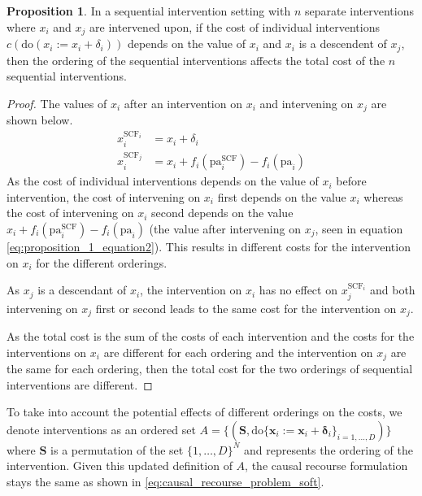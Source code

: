 \textbf{Proposition 1}. In a sequential intervention setting with $n$ separate interventions where $x_i$ and $x_j$ are intervened upon, if the cost of individual interventions $c(\text{do}(x_i:=x_i + \delta_i))$ depends on the value of $x_i$ and $x_i$ is a descendent of $x_j$, then the ordering of the sequential interventions affects the total cost of the $n$ sequential interventions.

\begin{proof}
	The values of $x_i$ after an intervention on $x_i$ and intervening on $x_j$ are shown below.
	\begin{align} \label{eq:proposition_1_equation}
		x^{\text{SCF}_i}_i & = x_i + \delta_i \\ \label{eq:proposition_1_equation2}
		x^{\text{SCF}_j}_i & = x_i + f_i(\text{pa}^{\text{SCF}}_i) - f_i(\text{pa}_i)
	\end{align}
	As the cost of individual interventions depends on the value of $x_i$ before intervention, the cost of intervening on $x_i$ first depends on the value $x_i$ whereas the cost of intervening on $x_i$ second depends on the value $x_i + f_i(\text{pa}^{\text{SCF}}_i) - f_i(\text{pa}_i)$ (the value after intervening on $x_j$, seen in equation \ref{eq:proposition_1_equation2}). This results in different costs for the intervention on $x_i$ for the different orderings.
	
	As $x_j$ is a descendant of $x_i$, the intervention on $x_i$ has no effect on $x^{\text{SCF}_i}_j$ and both intervening on $x_j$ first or second leads to the same cost for the intervention on $x_j$.
	
	As the total cost is the sum of the costs of each intervention and the costs for the interventions on $x_i$ are different for each ordering and the intervention on $x_j$ are the same for each ordering, then the total cost for the two orderings of sequential interventions are different. 
\end{proof}

To take into account the potential effects of different orderings on the costs, we denote interventions as an ordered set $A = \big\{(\mathbf{S}, \text{do} \{\mathbf{x}_i:=\mathbf{x}_i + \boldsymbol{\delta}_i\}_{i=1, \ldots, D})\big\}$ where $\mathbf{S}$ is a permutation of the set $\{1, \ldots, D\}^N$ and represents the ordering of the intervention. Given this updated definition of $A$, the causal recourse formulation stays the same as shown in \ref{eq:causal_recourse_problem_soft}.

